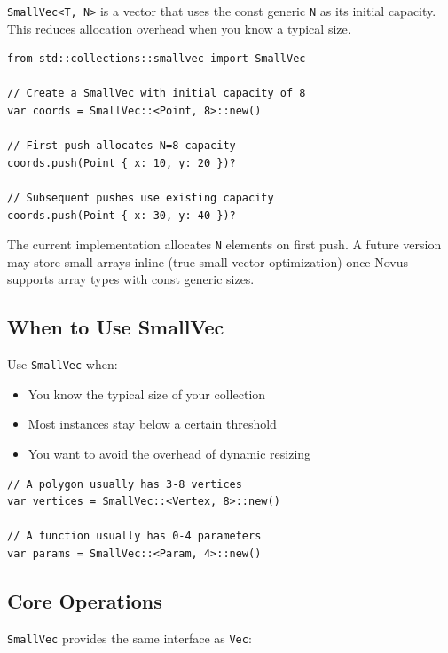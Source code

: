 \texttt{SmallVec<T, N>} is a vector that uses the const generic \texttt{N} as its initial capacity. This reduces allocation overhead when you know a typical size.

\begin{lstlisting}
from std::collections::smallvec import SmallVec

// Create a SmallVec with initial capacity of 8
var coords = SmallVec::<Point, 8>::new()

// First push allocates N=8 capacity
coords.push(Point { x: 10, y: 20 })?

// Subsequent pushes use existing capacity
coords.push(Point { x: 30, y: 40 })?
\end{lstlisting}

\begin{notebox}
The current implementation allocates \texttt{N} elements on first push. A future version may store small arrays inline (true small-vector optimization) once Novus supports array types with const generic sizes.
\end{notebox}

\subsection{When to Use SmallVec}

Use \texttt{SmallVec} when:
\begin{itemize}
    \item You know the typical size of your collection
    \item Most instances stay below a certain threshold
    \item You want to avoid the overhead of dynamic resizing
\end{itemize}

\begin{lstlisting}
// A polygon usually has 3-8 vertices
var vertices = SmallVec::<Vertex, 8>::new()

// A function usually has 0-4 parameters
var params = SmallVec::<Param, 4>::new()
\end{lstlisting}

\subsection{Core Operations}

\texttt{SmallVec} provides the same interface as \texttt{Vec}:

